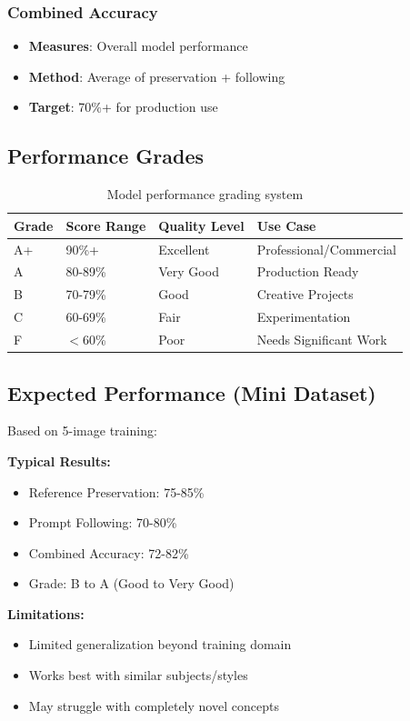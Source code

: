 \documentclass[11pt,a4paper]{article}
\begin{document}
\subsubsection{Combined Accuracy}
\begin{itemize}
    \item \textbf{Measures}: Overall model performance
    \item \textbf{Method}: Average of preservation + following
    \item \textbf{Target}: 70\%+ for production use
\end{itemize}

\subsection{Performance Grades}

\begin{table}[h]
\centering
\begin{tabular}{@{}llll@{}}
\toprule
\textbf{Grade} & \textbf{Score Range} & \textbf{Quality Level} & \textbf{Use Case} \\
\midrule
A+ & 90\%+ & Excellent & Professional/Commercial \\
A & 80-89\% & Very Good & Production Ready \\
B & 70-79\% & Good & Creative Projects \\
C & 60-69\% & Fair & Experimentation \\
F & $<$60\% & Poor & Needs Significant Work \\
\bottomrule
\end{tabular}
\caption{Model performance grading system}
\end{table}

\subsection{Expected Performance (Mini Dataset)}

Based on 5-image training:

\begin{successbox}
\textbf{Typical Results:}
\begin{itemize}
    \item Reference Preservation: 75-85\%
    \item Prompt Following: 70-80\%
    \item Combined Accuracy: 72-82\%
    \item Grade: B to A (Good to Very Good)
\end{itemize}

\textbf{Limitations:}
\begin{itemize}
    \item Limited generalization beyond training domain
    \item Works best with similar subjects/styles
    \item May struggle with completely novel concepts
\end{itemize}
\end{successbox}
\end{document}
